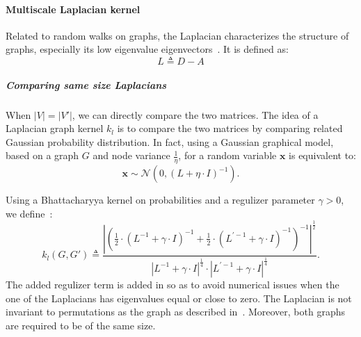             \paragraph{Multiscale Laplacian kernel}
                Related to random walks on graphs, the Laplacian characterizes the structure of graphs, especially its low eigenvalue eigenvectors~\parencite{kondor2016multiscale}.
                It is defined as:
                \begin{equation}
                    \label{eq::laplacian_graph}
                    L \triangleq D - A
                \end{equation}

                \subparagraph{Comparing same size Laplacians}
                    When $\vert V \vert = \vert V' \vert$, we can directly compare the two matrices.
                    The idea of a Laplacian graph kernel $k_{l}$ is to compare the two matrices by comparing related Gaussian probability distribution.
                    In fact, using a Gaussian graphical model, based on a graph $G$ and node variance $\frac{1}{\eta}$, for a random variable $\bm{x}$ is equivalent to:
                    \begin{equation}
                        \label{eq::guassian_gm}
                        \bm{x} \sim \mathscr{N}\left(0, \left(L + \eta \cdot I\right)^{-1}\right).
                    \end{equation}

                    Using a Bhattacharyya kernel on probabilities and a regulizer parameter $\gamma>0$, we define~\parencite{kondor2016multiscale}:
                    \begin{equation}
                        \label{eq::laplacian_kernel}
                        k_{l}(G, G') \triangleq \frac{\left\lvert \left(\frac{1}{2} \cdot \left(L^{-1}+\gamma\cdot I\right)^{-1} + \frac{1}{2} \cdot \left(L^{\prime -1}+\gamma\cdot I\right)^{-1} \right)^{-1} \right\rvert^{\frac{1}{2}}}{\left\lvert L^{-1} + \gamma \cdot I\right\rvert^{\frac{1}{4}}\cdot\left\lvert L^{\prime -1} + \gamma \cdot I\right\rvert^{\frac{1}{4}}}.
                    \end{equation}
                    The added regulizer term is added in so as to avoid numerical issues when the one of the Laplacians has eigenvalues equal or close to zero.
                    The Laplacian is not invariant to permutations as the graph as described in~\textcite{kondor2016multiscale}.
                    Moreover, both graphs are required to be of the same size.\\

